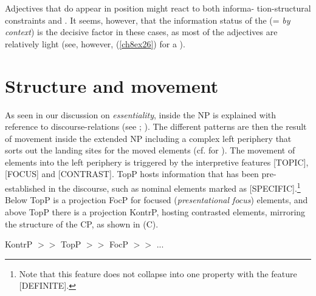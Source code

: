 \documentclass[output=paper,colorlinks,citecolor=brown]{langscibook}
\begin{document}
Adjectives that do appear in  position might react to both informa- tion-structural constraints and . It seems, however, that the information status of the  (=\emph{
by context}) is the decisive factor in these cases, as most of the
 adjectives are relatively light (see, however, (\ref{ch8ex26}) for a
  ).



\section{Structure and movement}\label{ch8s4}\largerpage
As seen in our discussion on \emph{essentiality},  
inside the NP is explained with reference to discourse-relations (see
\citealp{Truswell2005}; \citealp{Laenzlinger2005}). The different  patterns are
then the result of movement inside the extended NP including a complex
left periphery that sorts out the landing sites for the moved elements
(cf. \citealp{Giusti2005} for ). The movement of elements into the left
periphery is triggered by the interpretive features {[}TOPIC{]},
{[}FOCUS{]} and {[}CONTRAST{]}. TopP hosts information that has been
pre-es\-tab\-lished in the discourse, such as nominal elements marked as
{[}SPECIFIC{]}.\footnote{Note that this feature does not collapse into
  one property with the feature {[}DEFINITE{]}.} Below TopP is a
projection FocP for focused (\emph{presentational focus}) elements,
and above TopP there is a projection KontrP, hosting contrasted
elements, mirroring the structure of the CP, as shown in (C).

\begin{exe}
\label{ch8exc}
KontrP {$>>$}  TopP $>>$ FocP $>>$  ...
\end{exe}
\end{document}
